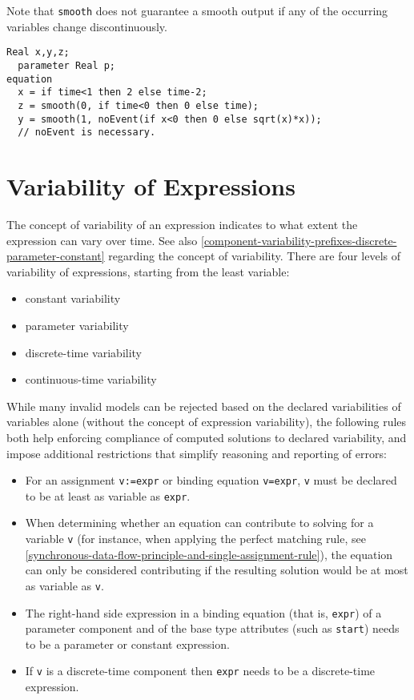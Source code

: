 \begin{nonnormative}
Note that \lstinline!smooth! does not guarantee a smooth output if any of the occurring variables change discontinuously.
\end{nonnormative}

\begin{example}
\begin{lstlisting}[language=modelica]
  Real x,y,z;
  parameter Real p;
equation
  x = if time<1 then 2 else time-2;
  z = smooth(0, if time<0 then 0 else time);
  y = smooth(1, noEvent(if x<0 then 0 else sqrt(x)*x));
  // noEvent is necessary.
\end{lstlisting}
\end{example}

\section{Variability of Expressions}\label{variability-of-expressions}

The concept of variability of an expression indicates to what extent the
expression can vary over time. See also \cref{component-variability-prefixes-discrete-parameter-constant} regarding the
concept of variability. There are four levels of variability of
expressions, starting from the least variable:
\begin{itemize}
\item
  constant variability
\item
  parameter variability
\item
  discrete-time variability
\item
  continuous-time variability
\end{itemize}

While many invalid models can be rejected based on the declared variabilities of variables alone (without the concept of expression
variability), the following rules both help enforcing compliance of computed solutions to declared variability, and impose additional
restrictions that simplify reasoning and reporting of errors:
\begin{itemize}
\item
  For an assignment \lstinline!v:=expr! or binding equation \lstinline!v=expr!, \lstinline!v! must be declared
  to be at least as variable as \lstinline!expr!.
\item
  When determining whether an equation can contribute to solving for a variable \lstinline!v! (for instance,
  when applying the perfect matching rule, see \cref{synchronous-data-flow-principle-and-single-assignment-rule}),
  the equation can only be considered contributing if the resulting solution would be at most as variable as \lstinline!v!.
\item
  The right-hand side expression in a binding equation (that is, \lstinline!expr!) of a parameter component and of the base type attributes
  (such as \lstinline!start!) needs to be a parameter or constant expression.
\item
  If \lstinline!v! is a discrete-time component then \lstinline!expr! needs to be a
  discrete-time expression.
\end{itemize}

